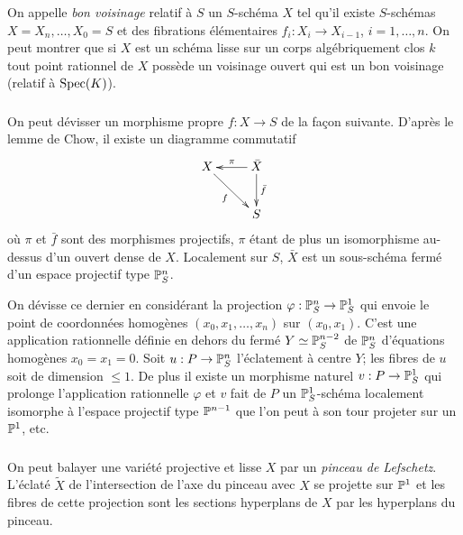 \documentclass[oneside]{book}
\begin{document}
On appelle \emph{bon voisinage} relatif à $S$ un $S$-schéma $X$ tel qu'il 
existe $S$-schémas $X=X_n,\dotsc,X_0=S$ et des fibrations élémentaires 
$f_i:X_i\to X_{i-1}$, $i=1,\dotsc,n$. On peut montrer \cite[XI 3.3]{4} que si 
$X$ est un schéma lisse sur un corps algébriquement clos $k$ tout point 
rationnel de $X$ possède un voisinage ouvert qui est un bon voisinage 
(relatif à $\operatorname{Spec}(K)$). 





\subsubsection{}\label{I:3-4-3}

On peut dévisser un morphisme propre $f:X\to S$ de la façon suivante. 
D'après le lemme de Chow, il existe un diagramme commutatif
\[\xymatrix{
  X \ar[dr]_-f 
    & \ar[l]_-\pi \ar[d]^-{\bar f} \bar X \\
  & S
}\]
où $\pi$ et $\bar f$ sont des morphismes projectifs, $\pi$ étant de plus un 
isomorphisme au-dessus d'un ouvert dense de $X$. Localement sur $S$, $\bar X$ 
est un sous-schéma fermé d'un espace projectif type $\mathbb{P}_S^n$. 

On dévisse ce dernier en considérant la projection 
$\varphi:\mathbb{P}_S^n\to\mathbb{P}_S^1$ qui envoie le point de coordonnées homogènes 
$(x_0,x_1,\dotsc,x_n)$ sur $(x_0,x_1)$. C'est une application rationnelle 
définie en dehors du fermé $Y\simeq \mathbb{P}_S^{n-2}$ de $\mathbb{P}_S^n$ d'équations 
homogènes $x_0=x_1=0$. Soit $u:P\to \mathbb{P}_S^n$ l'éclatement à centre 
$Y$; les fibres de $u$ soit de dimension $\leqslant 1$. De plus il existe un 
morphisme naturel $v:P\to \mathbb{P}_S^1$ qui prolonge l'application rationnelle 
$\varphi$ et $v$ fait de $P$ un $\mathbb{P}_S^1$-schéma localement isomorphe à 
l'espace projectif type $\mathbb{P}^{n-1}$ que l'on peut à son tour projeter sur un 
$\mathbb{P}^1$, etc. 





\subsubsection{}\label{I:3-4-4}

On peut balayer une variété projective et lisse $X$ par un \emph{pinceau de 
Lefschetz}. L'éclaté $\widetilde X$ de l'intersection de l'axe du pinceau 
avec $X$ se projette sur $\mathbb{P}^1$ et les fibres de cette projection sont les 
sections hyperplans de $X$ par les hyperplans du pinceau.
\end{document}
